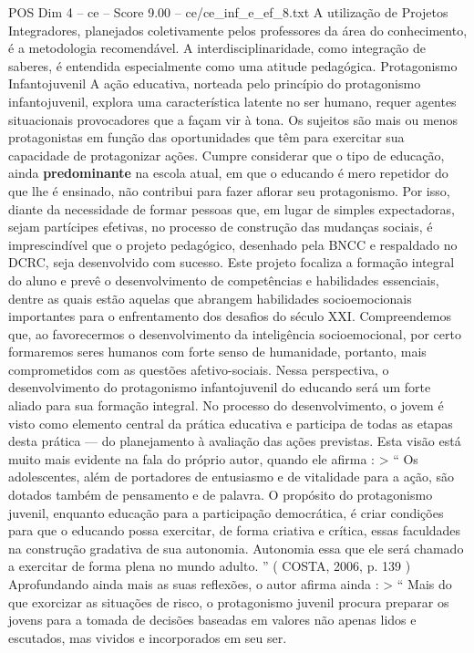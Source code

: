 \begin{textsample}{POS Dim 4 – ce – Score 9.00 – ce/ce\_inf\_e\_ef\_8.txt}
A utilização de Projetos Integradores, planejados coletivamente pelos professores da área do conhecimento, é a metodologia recomendável.
A interdisciplinaridade, como integração de saberes, é entendida especialmente como uma atitude pedagógica.
Protagonismo Infantojuvenil A ação educativa, norteada pelo princípio do protagonismo infantojuvenil, explora uma característica latente no ser humano, requer agentes situacionais provocadores que a façam vir à tona.
Os sujeitos são mais ou menos protagonistas em função das oportunidades que têm para exercitar sua capacidade de protagonizar ações.
Cumpre considerar que o tipo de educação, ainda \textbf{predominante} na escola atual, em que o educando é mero repetidor do que lhe é ensinado, não contribui para fazer aflorar seu protagonismo.
Por isso, diante da necessidade de formar pessoas que, em lugar de simples expectadoras, sejam partícipes efetivas, no processo de construção das mudanças sociais, é imprescindível que o projeto pedagógico, desenhado pela BNCC e respaldado no DCRC, seja desenvolvido com sucesso.
Este projeto focaliza a formação integral do aluno e prevê o desenvolvimento de competências e habilidades essenciais, dentre as quais estão aquelas que abrangem habilidades socioemocionais importantes para o enfrentamento dos desafios do século XXI.
Compreendemos que, ao favorecermos o desenvolvimento da inteligência socioemocional, por certo formaremos seres humanos com forte senso de humanidade, portanto, mais comprometidos com as questões afetivo-sociais.
Nessa perspectiva, o desenvolvimento do protagonismo infantojuvenil do educando será um forte aliado para sua formação integral.
No processo do desenvolvimento, o jovem é visto como elemento central da prática educativa e participa de todas as etapas desta prática — do planejamento à avaliação das ações previstas.
Esta visão está muito mais evidente na fala do próprio autor, quando ele afirma : > “ Os adolescentes, além de portadores de entusiasmo e de vitalidade para a ação, são dotados também de pensamento e de palavra.
O propósito do protagonismo juvenil, enquanto educação para a participação democrática, é criar condições para que o educando possa exercitar, de forma criativa e crítica, essas faculdades na construção gradativa de sua autonomia.
Autonomia essa que ele será chamado a exercitar de forma plena no mundo adulto. ” ( COSTA, 2006, p. 139 ) Aprofundando ainda mais as suas reflexões, o autor afirma ainda : > “ Mais do que exorcizar as situações de risco, o protagonismo juvenil procura preparar os jovens para a tomada de decisões baseadas em valores não apenas lidos e escutados, mas vividos e incorporados em seu ser.

\end{textsample}
